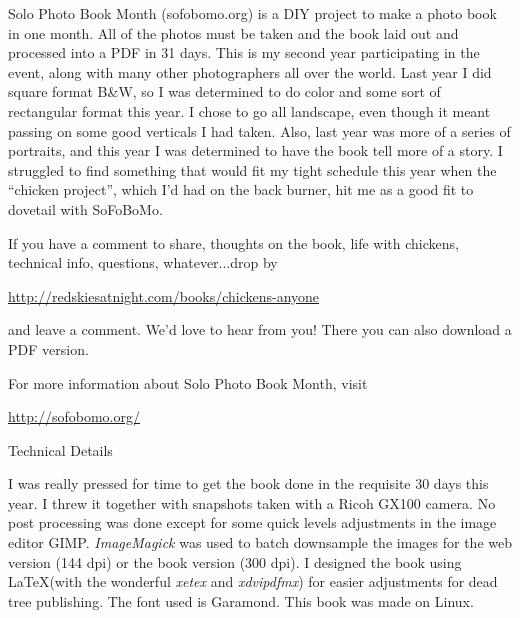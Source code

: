 Solo Photo Book Month (sofobomo.org) is a DIY project to make a photo
book in one month. All of the photos must be taken and the book laid 
out and processed into a PDF in 31 days. This is my second year
participating in the event, along with many other photographers all over
the world. 
Last year I did square format B\&W, so I was determined to do color and
some sort of rectangular format this year. I chose to go all landscape, 
even though it meant passing on some good verticals I had taken. Also,
last year was more of a series of portraits, and this year I was
determined to have the book tell more of a story. I struggled to find
something that would fit my tight schedule this year when the ``chicken
project'', which I'd had on the back burner, hit me as a good fit to
dovetail with SoFoBoMo. 

If you have a comment to share, thoughts on the book, life with
chickens, technical info, questions, whatever...drop by 

\url{http://redskiesatnight.com/books/chickens-anyone}

and leave a comment. We'd love to hear from you! There you can also
download a PDF version. 

For more information about Solo Photo Book Month, visit

\url{http://sofobomo.org/}

\vspace*{0.25in}

{\LARGE Technical Details}

I was really pressed for time to get the book done in the requisite 30
days this year. I threw it together with snapshots taken with a Ricoh
GX100 camera. No post processing was done except for some quick levels
adjustments in the image editor GIMP.
{\em ImageMagick} was used to batch downsample the images for the web version
(144 dpi) or the book version (300 dpi). 
I designed the book using \LaTeX (with the wonderful {\em xetex} and
{\em xdvipdfmx}) for easier adjustments for dead tree publishing. 
The font used is Garamond. This book was made on Linux.

